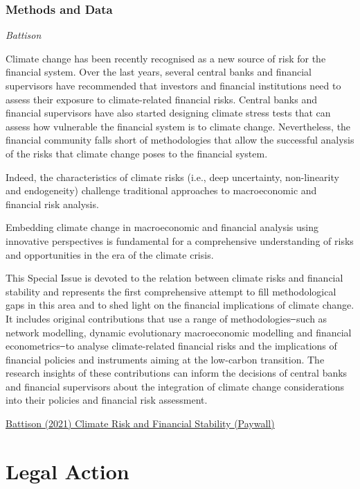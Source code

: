 \documentclass[
]{book}
\begin{document}
\hypertarget{methods-and-data}{%
\subsection{Methods and Data}\label{methods-and-data}}

\emph{Battison}

Climate change has been recently recognised as a new source of risk for the financial system. Over the last years, several central banks and financial supervisors have recommended that investors and financial institutions need to assess their exposure to climate-related financial risks. Central banks and financial supervisors have also started designing climate stress tests that can assess how vulnerable the financial system is to climate change.
Nevertheless, the financial community falls short of methodologies that allow the successful analysis of the risks that climate change poses to the financial system.

Indeed, the characteristics of climate risks (i.e., deep uncertainty, non-linearity and endogeneity) challenge traditional approaches to macroeconomic and financial risk analysis.

Embedding climate change in macroeconomic and financial analysis using innovative perspectives is fundamental for a comprehensive understanding of risks and opportunities in the era of the climate crisis.

This Special Issue is devoted to the relation between climate risks and financial stability and represents the first comprehensive attempt to fill methodological gaps in this area and to shed light on the financial implications of climate change. It includes original contributions that use a range of methodologies ̶ such as network modelling, dynamic evolutionary macroeconomic modelling and financial econometrics ̶ to analyse climate-related financial risks and the implications of financial policies and instruments aiming at the low-carbon transition. The research insights of these contributions can inform the decisions of central banks and financial supervisors about the integration of climate change considerations into their policies and financial risk assessment.

\href{https://www.sciencedirect.com/science/article/abs/pii/S1572308921000267}{Battison (2021) Climate Risk and Financial Stability (Paywall)}

\hypertarget{legal-action}{%
\chapter{Legal Action}\label{legal-action}}
\end{document}
